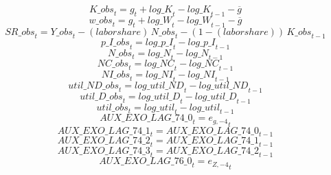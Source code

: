 \begin{dmath}
{K\_obs}_{t}={{g}}_{t}+{log\_K}_{t}-{log\_K}_{t-1}-{{\overline{g}}}
\end{dmath}
\begin{dmath}
{w\_obs}_{t}={{g}}_{t}+{log\_W}_{t}-{log\_W}_{t-1}-{{\overline{g}}}
\end{dmath}
\begin{dmath}
{SR\_obs}_{t}={Y\_obs}_{t}-{(labor share)}\, {N\_obs}_{t}-\left(1-{(labor share)}\right)\, {K\_obs}_{t-1}
\end{dmath}
\begin{dmath}
{p\_I\_obs}_{t}={log\_p\_I}_{t}-{log\_p\_I}_{t-1}
\end{dmath}
\begin{dmath}
{N\_obs}_{t}={log\_N}_{t}-{log\_N}_{t-1}
\end{dmath}
\begin{dmath}
{NC\_obs}_{t}={log\_NC}_{t}-{log\_NC}_{t-1}
\end{dmath}
\begin{dmath}
{NI\_obs}_{t}={log\_NI}_{t}-{log\_NI}_{t-1}
\end{dmath}
\begin{dmath}
{util\_ND\_obs}_{t}={log\_util\_ND}_{t}-{log\_util\_ND}_{t-1}
\end{dmath}
\begin{dmath}
{util\_D\_obs}_{t}={log\_util\_D}_{t}-{log\_util\_D}_{t-1}
\end{dmath}
\begin{dmath}
{util\_obs}_{t}={log\_util}_{t}-{log\_util}_{t-1}
\end{dmath}
\begin{dmath}
{AUX\_EXO\_LAG\_74\_0}_{t}={{e_{g,-4}}}_{t}
\end{dmath}
\begin{dmath}
{AUX\_EXO\_LAG\_74\_1}_{t}={AUX\_EXO\_LAG\_74\_0}_{t-1}
\end{dmath}
\begin{dmath}
{AUX\_EXO\_LAG\_74\_2}_{t}={AUX\_EXO\_LAG\_74\_1}_{t-1}
\end{dmath}
\begin{dmath}
{AUX\_EXO\_LAG\_74\_3}_{t}={AUX\_EXO\_LAG\_74\_2}_{t-1}
\end{dmath}
\begin{dmath}
{AUX\_EXO\_LAG\_76\_0}_{t}={{e_{Z,-4}}}_{t}
\end{dmath}
